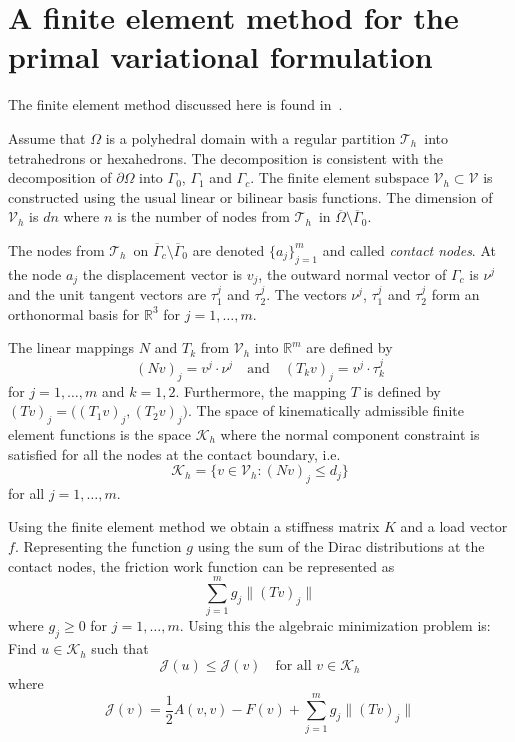 \documentclass[12pt,a4paper]{article}
\numberwithin{equation}{section}
\numberwithin{table}{section}
\numberwithin{figure}{section}
\newcommand{\R}{\ensuremath{\mathbb{R}}}
\newcommand{\J}{\ensuremath{\mathcal{J}}}
\newcommand{\half}{\ensuremath{\frac{1}{2}}}
\newcommand{\dOmega}{{\partial\Omega}}
\newcommand{\V}{\ensuremath{\mathcal{V}}}
\newcommand{\K}{\ensuremath{\mathcal{K}}}
\newcommand{\Kh}{\ensuremath{\K_h}}
\newcommand{\Vh}{{\mathcal V}_h}
\newcommand{\Th}{\ensuremath{{\mathcal T}_h}}
\providecommand{\norm}[1]{\lVert #1 \rVert}
\newcommand{\qforall}{\quad\text{for all }}
\begin{document}
\section{A finite element method for the primal variational formulation}
\label{sec:finite-elem-meth}

The finite element method discussed here is found in~\cite{haslinger04:3dContact}.

Assume that $\Omega$ is a polyhedral domain with a regular partition \Th\ into
tetrahedrons or hexahedrons.  The decomposition is consistent with the decomposition of
$\dOmega$ into $\Gamma_0$, $\Gamma_1$ and $\Gamma_c$.  The finite element subspace
$\Vh\subset\V$ is constructed using the usual linear or bilinear basis functions.  The
dimension of $\Vh$ is $d n$ where $n$ is the number of nodes from \Th\ in
$\overline{\Omega} \setminus \overline{\Gamma}_0$.

The nodes from \Th\ on $\overline{\Gamma}_c \setminus \overline{\Gamma}_0$ are denoted
$\{a_j\}_{j=1}^{m}$ and called \emph{contact nodes}.  At the node $a_j$ the displacement
vector is $v_j$, the outward normal vector of $\Gamma_c$ is $\nu^j$ and the unit tangent
vectors are $\tau_1^j$ and $\tau_2^j$.  The vectors $\nu^j$, $\tau_1^j$ and $\tau_2^j$
form an orthonormal basis for $\R^3$ for $j=1,\dots,m$.

The linear mappings $N$ and $T_k$ from $\Vh$ into $\R^m$ are defined by
\begin{equation}
  \label{eq:11}
  (Nv)_j = v^j\cdot\nu^j\quad\text{and}\quad (T_k v)_j = v^j\cdot \tau_k^j
\end{equation}
for $j=1,\dotsc,m$ and $k=1,2$.  Furthermore, the mapping $T$ is defined by $(Tv)_j =
\bigl( (T_1 v)_j, (T_2 v)_j \bigr)$.  The space of kinematically admissible finite element
functions is the space $\K_h$ where the normal component constraint is satisfied for all
the nodes at the contact boundary, i.e.
\begin{equation}
  \label{eq:4}
  \K_h = \{ v\in\Vh \colon (N v)_j \le d_j\}
\end{equation}
for all $j=1,\dotsc,m$.

Using the finite element method we obtain a stiffness matrix $K$ and a load vector $f$.
Representing the function $g$ using the sum of the Dirac distributions at the contact
nodes, the friction work function can be represented as
\begin{equation}
  \label{eq:3}
  \sum_{j=1}^m g_j \norm{(T v)_j}
\end{equation}
where $g_j \ge 0$ for $j=1,\dots,m$.  Using this the algebraic minimization problem is:
Find $u\in\Kh$ such that
\begin{equation}
  \label{eq:5}
  \J(u) \le \J(v) \qforall v\in\Kh
\end{equation}
where
\begin{equation}
  \label{eq:8}
  \J(v) = \half A(v,v) - F(v) + \sum_{j=1}^m g_j \norm{(T v)_j}
\end{equation}
\end{document}
